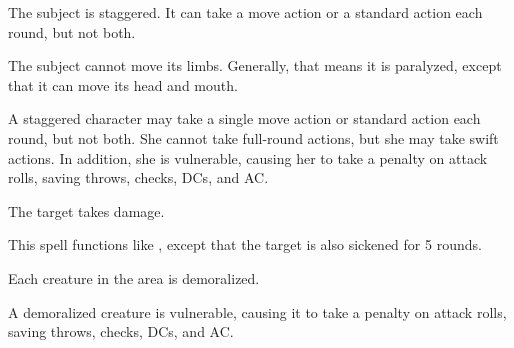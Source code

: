 \spellrng{\rngmed}
\spelldur{\durshort}
\begin{spellhealthy}
  The subject is staggered. It can take a move action or a standard action each round, but not both. 
\end{spellhealthy}
\begin{spellblood}
  The subject cannot move its limbs. Generally, that means it is paralyzed, except that it can move its head and mouth.
\end{spellblood}
\begin{spellnotes}
 A staggered character may take a single move action or standard action each round, but not both. She cannot take full-round actions, but she may take swift actions. In addition, she is vulnerable, causing her to take a  penalty on attack rolls, saving throws, checks, DCs, and AC.
\end{spellnotes}

\spellrng{\rngmed}
\begin{spelleffect}
  The target takes damage.
\end{spelleffect}

\begin{spelleffect}
  This spell functions like , except that the target is also sickened for 5 rounds.
\end{spelleffect}

\spelldur{\durmed}
\begin{spelleffect}
  Each creature in the area is demoralized.
\end{spelleffect}
\begin{spellnotes}
  A demoralized creature is vulnerable, causing it to take a  penalty on attack rolls, saving throws, checks, DCs, and AC.
\end{spellnotes}

